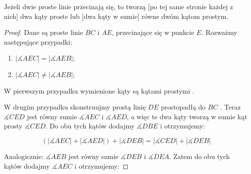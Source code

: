 \documentclass[12pt, a4paper]{scrartcl}
\begin{document}
\begin{theorem}
    Jeżeli dwie proste linie przecinają się, to tworzą [po tej same stronie
    każdej z nich] dwa kąty proste lub [dwa kąty w sumie] równe dwóm kątom
    prostym.

    \begin{figure}[!h]
        \begin{center}
        \end{center}
    \end{figure}

    \begin{proof}
        Dane są proste linie \(BC\) i \(AE\), przecinające się w punkcie \(E\).
        Rozważmy następujące przypadki:

        \begin{enumerate}
            \item \(|\measuredangle AEC| = |\measuredangle AEB|\);
            \item \(|\measuredangle AEC| \neq |\measuredangle AEB|\);
        \end{enumerate}

        W pierwszym przypadku wymienione kąty są kątami prostymi .

        W drugim przypadku skonstruujmy prostą linię \(DE\) prostopadłą do
        \(BC\) . Teraz \(\measuredangle CED\) jest równy sumie
        \(\measuredangle AEC\) i \(\measuredangle AED\), a więc te dwa kąty
        tworzą w sumie kąt prosty \(\measuredangle CED\). Do obu tych kątów
        dodajmy \(\measuredangle DBE\)  i otrzymujemy:

        \[ (|\measuredangle AEC| + |\measuredangle AED|) + |\measuredangle DEB|
            = |\measuredangle CED| + |\measuredangle DEB| \]

        Analogicznie: \(\measuredangle AEB\) jest równy sumie \(\measuredangle
        DEB\) i \(\measuredangle DEA\). Zatem do obu tych kątów dodajmy
        \(\measuredangle AEC\)  i otrzymujemy:


\end{proof}
\end{theorem}
\end{document}
